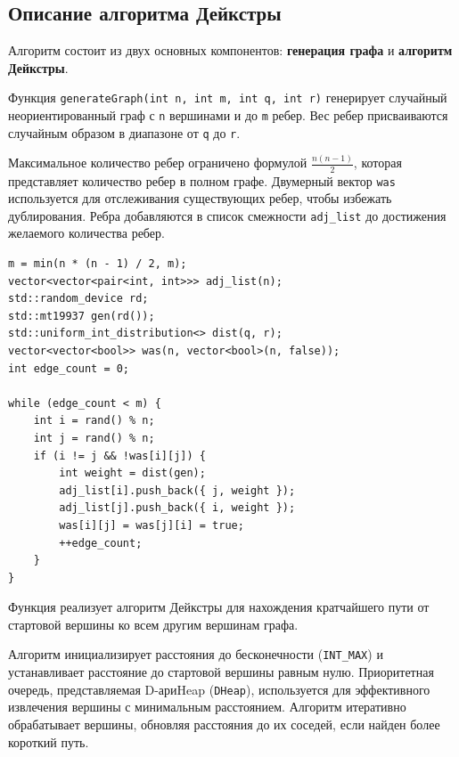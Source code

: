 \subsection{Описание алгоритма Дейкстры}

Алгоритм состоит из двух основных компонентов: \textbf{генерация графа} и \textbf{алгоритм Дейкстры}.

Функция \texttt{generateGraph(int n, int m, int q, int r)} генерирует случайный неориентированный граф с \texttt{n} вершинами и до \texttt{m} ребер. Вес ребер присваиваются случайным образом в диапазоне от \texttt{q} до \texttt{r}.

Максимальное количество ребер ограничено формулой \( \frac{n(n-1)}{2} \), которая представляет количество ребер в полном графе. Двумерный вектор \texttt{was} используется для отслеживания существующих ребер, чтобы избежать дублирования. Ребра добавляются в список смежности \texttt{adj\_list} до достижения желаемого количества ребер.

\begin{lstlisting}
m = min(n * (n - 1) / 2, m);
vector<vector<pair<int, int>>> adj_list(n);
std::random_device rd;
std::mt19937 gen(rd());
std::uniform_int_distribution<> dist(q, r);
vector<vector<bool>> was(n, vector<bool>(n, false));
int edge_count = 0;

while (edge_count < m) {
    int i = rand() % n;
    int j = rand() % n;
    if (i != j && !was[i][j]) {
        int weight = dist(gen);
        adj_list[i].push_back({ j, weight });
        adj_list[j].push_back({ i, weight });
        was[i][j] = was[j][i] = true;
        ++edge_count;
    }
}
\end{lstlisting}

Функция реализует алгоритм Дейкстры для нахождения кратчайшего пути от стартовой вершины ко всем другим вершинам графа.

Алгоритм инициализирует расстояния до бесконечности (\texttt{INT\_MAX}) и устанавливает расстояние до стартовой вершины равным нулю. Приоритетная очередь, представляемая D-ариHeap (\texttt{DHeap}), используется для эффективного извлечения вершины с минимальным расстоянием. Алгоритм итеративно обрабатывает вершины, обновляя расстояния до их соседей, если найден более короткий путь.

